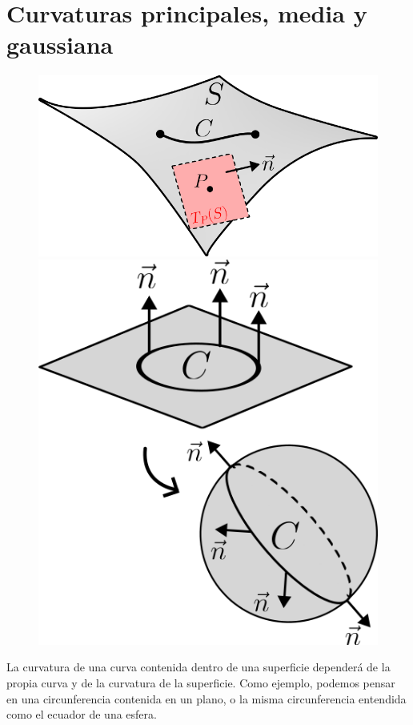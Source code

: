 \section{Curvaturas principales, media y gaussiana}
\begin{figure}
    \centering
    \includegraphics[scale=.26]{FOTOS/cpmg_1.png}
    \includegraphics[scale=.35]{FOTOS/cpmg_2.png}
\end{figure}
La curvatura de una curva contenida dentro de una superficie dependerá de la propia curva y de la curvatura de la superficie. Como ejemplo, podemos pensar en una circunferencia contenida en un plano, o la misma circunferencia entendida como el ecuador de una esfera. \\

